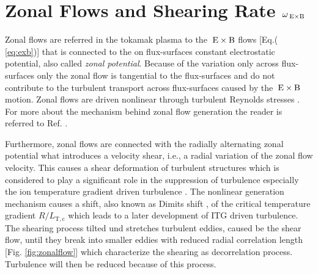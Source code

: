 \section{Zonal Flows and Shearing Rate $\omega_{\mathrm{\:E \times B}}$}
\label{sec:zonalflow}

Zonal flows are referred in the tokamak plasma to the $\mathrm{\:E}\times\mathrm{B}$ flows [Eq.( \ref{eq:exb})] that is connected to the on flux-surfaces constant electrostatic potential, also called \textit{zonal potential}. \cite{Diamond2005} Because of the variation only across flux-surfaces only the zonal flow is tangential to the flux-surfaces and do not contribute to the turbulent transport across flux-surfaces caused by the $\mathrm{\:E}\times\mathrm{B}$ motion. 
Zonal flows are driven nonlinear through turbulent Reynolds stresses \cite{Diamond1991}. For more about the mechanism behind zonal flow generation the reader is referred to Ref. . \bigskip


Furthermore, zonal flows are connected with the radially alternating zonal potential what introduces a velocity shear, i.e., a radial variation of the zonal flow velocity. This causes a shear deformation of turbulent structures which is considered to play a significant role in the suppression of turbulence \cite{Biglari1990, Dimits2000} especially the ion temperature gradient driven turbulence \cite{Nakata2012, Makwana2014, Maeyama2014, Whelan2018, Whelan2019}. The nonlinear generation mechanism causes a shift, also known as Dimits shift \cite{Dimits2000}, of the critical temperature gradient $R/L_\mathrm{T,c}$ which leads to a later development of ITG driven turbulence. The shearing process tilted und stretches turbulent eddies, caused be the shear flow, until they break into smaller eddies with reduced radial correlation length [Fig. \ref{fig:zonalflow}] which characterize the shearing as decorrelation process. Turbulence will then be reduced because of this process. \cite{Biglari1990,Diamond2005,Burnell1997} \bigskip

\newpage

